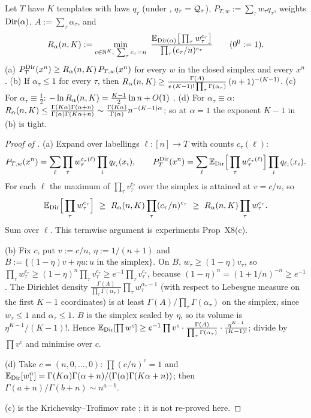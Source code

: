 \begin{lemma}[Regret]\label{lem:sound:regret}
Let $T$ have $K$ templates with laws $q_\tau$ (under \Lzero, $q_\tau=\mathcal{Q}_\tau$), $P_{T,w}:=\sum_\tau w_\tau q_\tau$, weights $\mathrm{Dir}(\alpha)$, $A:=\sum_\tau\alpha_\tau$, and
\[
R_{\alpha}(n,K):=\min_{c\in\mathbb{N}^K,\ \sum_\tau c_\tau=n}\ \frac{\mathbb{E}_{\mathrm{Dir}(\alpha)}\big[\prod_\tau w_\tau^{c_\tau}\big]}{\prod_\tau(c_\tau/n)^{c_\tau}}\qquad(0^0:=1).
\]
(a) $P^{\mathrm{Dir}}_{T}(x^n)\ge R_{\alpha}(n,K)\,P_{T,w}(x^n)$ for every $w$ in the closed simplex and every $x^n$.
(b) If $\alpha_\tau\le1$ for every $\tau$, then $R_{\alpha}(n,K)\ge\frac{\Gamma(A)}{e\,(K-1)!\prod_\tau\Gamma(\alpha_\tau)}\,(n+1)^{-(K-1)}$.
(c) For $\alpha_\tau\equiv\tfrac12$: $-\ln R_{\alpha}(n,K)=\tfrac{K-1}2\ln n+O(1)$ \citep{krichevsky1981performance}.
(d) For $\alpha_\tau\equiv\alpha$: $R_{\alpha}(n,K)\le\frac{\Gamma(K\alpha)\Gamma(\alpha+n)}{\Gamma(\alpha)\Gamma(K\alpha+n)}\sim\frac{\Gamma(K\alpha)}{\Gamma(\alpha)}n^{-(K-1)\alpha}$; so at $\alpha=1$ the exponent $K-1$ in (b) is tight.
\end{lemma}

\begin{proof}[Proof of ]
(a) Expand over labellings $\ell:[n]\to T$ with counts $c_\tau(\ell)$:
\[
P_{T,w}(x^n)=\sum_\ell\prod_\tau w_\tau^{c_\tau(\ell)}\prod_iq_{\ell_i}(x_i),\qquad
P^{\mathrm{Dir}}_{T}(x^n)=\sum_\ell\mathbb{E}_{\mathrm{Dir}}\Big[\prod_\tau w_\tau^{c_\tau(\ell)}\Big]\prod_iq_{\ell_i}(x_i).
\]
For each $\ell$ the maximum of $\prod_\tau v_\tau^{c_\tau}$ over the simplex is attained at $v=c/n$, so
\[
\Ex_{\Dir}\Big[\prod_\tau w_\tau^{c_\tau}\Big]\ \ge\ \Rreg(n,K)\prod_\tau(c_\tau/n)^{c_\tau}\ \ge\ \Rreg(n,K)\prod_\tau w_\tau^{c_\tau}.
\]
Sum over $\ell$. This termwise argument is experiments Prop~X8(c).

(b) Fix $c$, put $v:=c/n$, $\eta:=1/(n+1)$ and $B:=\{(1-\eta)v+\eta u:u\text{ in the simplex}\}$. On $B$, $w_\tau\ge(1-\eta)v_\tau$, so $\prod_\tau w_\tau^{c_\tau}\ge(1-\eta)^n\prod_\tau v_\tau^{c_\tau}\ge e^{-1}\prod_\tau v_\tau^{c_\tau}$, because $(1-\eta)^n=(1+1/n)^{-n}\ge e^{-1}$. The Dirichlet density $\frac{\Gamma(A)}{\prod_\tau\Gamma(\alpha_\tau)}\prod_\tau w_\tau^{\alpha_\tau-1}$ (with respect to Lebesgue measure on the first $K-1$ coordinates) is at least $\Gamma(A)/\prod_\tau\Gamma(\alpha_\tau)$ on the simplex, since $w_\tau\le1$ and $\alpha_\tau\le1$. $B$ is the simplex scaled by $\eta$, so its volume is $\eta^{K-1}/(K-1)!$. Hence $\mathbb{E}_{\mathrm{Dir}}[\prod w^c]\ge e^{-1}\prod v^c\cdot\frac{\Gamma(A)}{\prod_\tau\Gamma(\alpha_\tau)}\cdot\frac{\eta^{K-1}}{(K-1)!}$; divide by $\prod v^c$ and minimise over $c$.

(d) Take $c=(n,0,\dots,0)$: $\prod(c/n)^c=1$ and $\mathbb{E}_{\mathrm{Dir}}[w_1^n]=\Gamma(K\alpha)\Gamma(\alpha+n)/(\Gamma(\alpha)\Gamma(K\alpha+n))$; then $\Gamma(a+n)/\Gamma(b+n)\sim n^{a-b}$.

(c) is the Krichevsky--Trofimov rate \citep{krichevsky1981performance}; it is not re-proved here.
\end{proof}

